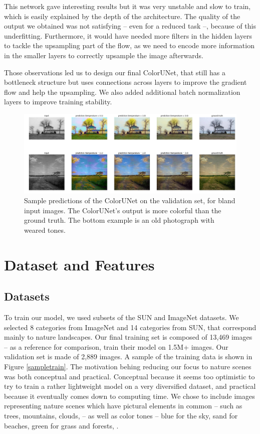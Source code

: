 \documentclass[10pt,twocolumn,letterpaper]{article}
\begin{document}
This network gave interesting results but it was very unstable and slow to train, which is easily explained by the depth of the architecture. The quality of the output we obtained was not satisfying -- even for a reduced task --, because of this underfitting. Furthermore, it would have needed more filters in the hidden layers to tackle the upsampling part of the flow, as we need to encode more information in the smaller layers to correctly upsample the image afterwards.

Those observations led us to design our final ColorUNet, that still has a bottleneck structure but uses connections across layers to improve the gradient flow and help the upsampling. We also added additional batch normalization layers to improve training stability.

\begin{figure}
\begin{center}
\includegraphics[width=450px]{better}
\caption{Sample predictions of the ColorUNet on the validation set, for bland input images. The ColorUNet's output is more colorful than the ground truth. The bottom example is an old photograph with weared tones.}
\label{better}
\end{center}
\end{figure}

\section{Dataset and Features}

\subsection{Datasets}

To train our model, we used subsets of the SUN \cite{xiao2010sun} and ImageNet \cite{russakovsky2015imagenet} datasets. We selected 8 categories from ImageNet and 14 categories from SUN, that correspond mainly to nature landscapes. Our final training set is composed of 13,469 images -- as a reference for comparison, \cite{zhang2016colorful} train their model on 1.5M+ images. Our validation set is made of 2,889 images. A sample of the training data is shown in Figure \ref{sampletrain}.
The motivation behing reducing our focus to nature scenes was both conceptual and practical. Conceptual because it seems too optimistic to try to train a rather lightweight model on a very diversified dataset, and practical because it eventually comes down to computing time. We chose to include images representing nature scenes which have pictural elements in common -- such as trees, mountains, clouds, \etc -- as well as color tones -- blue for the sky, sand for beaches, green for grass and forests,  \etc .
\end{document}
